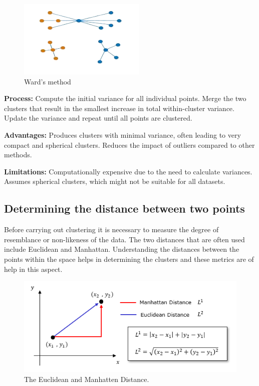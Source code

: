 \documentclass[conference]{IEEEtran}
\begin{document}
\begin{figure}
    \centering
    \includegraphics[width=0.6\linewidth]{ward_s_method-removebg-preview.png}
    \caption{Ward's method\cite{wardmethod}}
    \label{fig:enter-label}
\end{figure}

\textbf{Process:}
Compute the initial variance for all individual points.
Merge the two clusters that result in the smallest increase in total within-cluster variance.
Update the variance and repeat until all points are clustered.

\textbf{Advantages:}
Produces clusters with minimal variance, often leading to very compact and spherical clusters.
Reduces the impact of outliers compared to other methods.

\textbf{Limitations:}
Computationally expensive due to the need to calculate variances.
Assumes spherical clusters, which might not be suitable for all datasets.

\subsection{Determining the distance between two points}
Before carrying out clustering it is necessary to measure the degree of resemblance or non-likeness of the data. The two distances that are often used include Euclidean and Manhattan. Understanding the distances between the points within the space helps in determining the clusters and these metrics are of help in this aspect.\cite{xu2005survey}\cite{yim2015hierarchical}
\begin{figure}
    \centering
    \includegraphics[width=0.8\linewidth]{Euclidean and Manhatten distance.png}
    \caption{The Euclidean and Manhatten Distance.\cite{TheEuclideanandManhattenDistance}}
    \label{fig:enter-label}
\end{figure}
\end{document}
